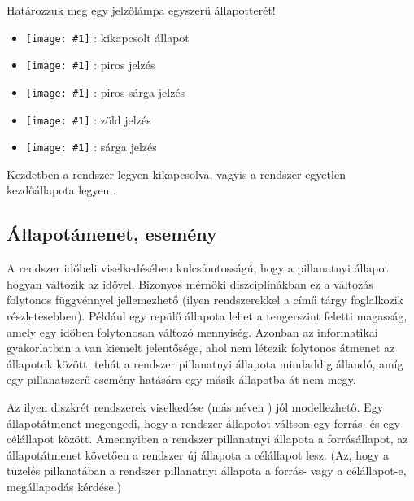 \begin{pelda}
Határozzuk meg egy jelzőlámpa egyszerű állapotterét!
\end{pelda}


\newcommand{\allapotikon}[1]{\texttt{[image: \#1]}}

\begin{itemize}
\item \allapotikon{tl_empty} : kikapcsolt állapot
\item \allapotikon{tl_red} : piros jelzés
\item \allapotikon{tl_redyellow} : piros-sárga jelzés
\item \allapotikon{tl_green} : zöld jelzés
\item \allapotikon{tl_yellow} : sárga jelzés
\end{itemize}

Kezdetben a rendszer legyen kikapcsolva, vagyis a rendszer egyetlen kezdőállapota legyen .

\subsection{Állapotámenet, esemény}

A rendszer időbeli viselkedésében kulcsfontosságú, hogy a pillanatnyi állapot hogyan változik az idővel. Bizonyos mérnöki diszciplínákban ez a változás folytonos függvénnyel jellemezhető (ilyen rendszerekkel a \rendszerelmelet című tárgy foglalkozik részletesebben). Például egy repülő állapota lehet a tengerszint feletti magasság, amely egy időben folytonosan változó mennyiség. Azonban az informatikai gyakorlatban a  van kiemelt jelentősége, ahol nem létezik folytonos átmenet az állapotok között, tehát a rendszer pillanatnyi állapota mindaddig állandó, amíg egy pillanatszerű esemény hatására egy másik állapotba át nem megy.

Az ilyen diszkrét rendszerek viselkedése  (más néven ) jól modellezhető. Egy állapotátmenet megengedi, hogy a rendszer állapotot váltson egy forrás- és egy célállapot között. Amennyiben a rendszer pillanatnyi állapota a forrásállapot, az állapotátmenet  követően a rendszer új állapota a célállapot lesz. (Az, hogy a tüzelés pillanatában a rendszer pillanatnyi állapota a forrás- vagy a célállapot-e, megállapodás kérdése.)

